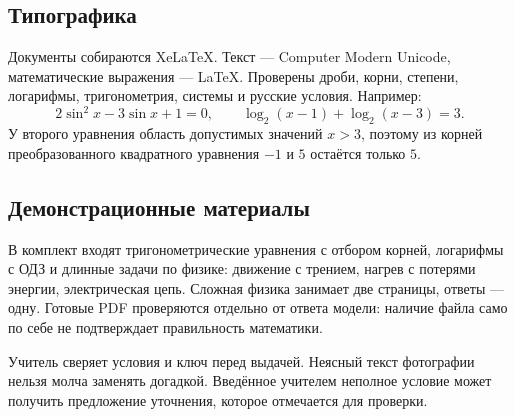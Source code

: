 \documentclass[a4paper,11pt]{article}
\newcommand{\note}[1]{\par\smallskip\colorbox{soft}{\parbox{\dimexpr\linewidth-2\fboxsep}{\small #1}}\par\smallskip}
\begin{document}
\subsection{Типографика}
Документы собираются XeLaTeX. Текст — Computer Modern Unicode, математические
выражения — LaTeX. Проверены дроби, корни, степени, логарифмы, тригонометрия,
системы и русские условия. Например:
\[
2\sin^2 x-3\sin x+1=0,\qquad
\log_2(x-1)+\log_2(x-3)=3.
\]
У второго уравнения область допустимых значений $x>3$, поэтому из корней
преобразованного квадратного уравнения $-1$ и $5$ остаётся только $5$.

\subsection{Демонстрационные материалы}
В комплект входят тригонометрические уравнения с отбором корней, логарифмы
с ОДЗ и длинные задачи по физике: движение с трением, нагрев с потерями энергии,
электрическая цепь. Сложная физика занимает две страницы, ответы — одну.
Готовые PDF проверяются отдельно от ответа модели: наличие файла само по себе
не подтверждает правильность математики.

\note{Учитель сверяет условия и ключ перед выдачей. Неясный текст фотографии
нельзя молча заменять догадкой. Введённое учителем неполное условие может получить
предложение уточнения, которое отмечается для проверки.}
\newpage
\end{document}
